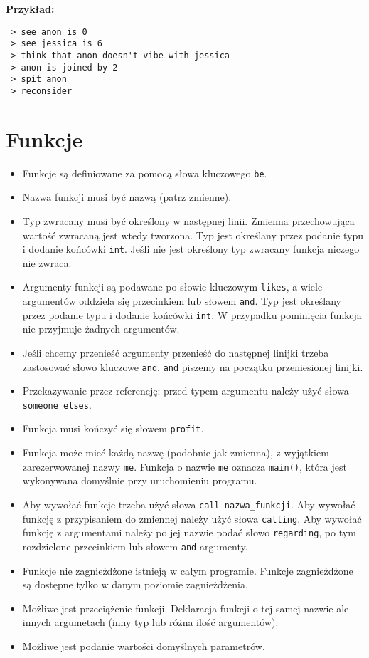 \documentclass{article}
\begin{document}
\textbf{Przykład:}
{ \color{green}
\begin{verbatim}
 > see anon is 0
 > see jessica is 6
 > think that anon doesn't vibe with jessica
 > anon is joined by 2
 > spit anon
 > reconsider
\end{verbatim}
}

\newpage

\section{Funkcje}

\begin{itemize}
    \item Funkcje są definiowane za pomocą słowa kluczowego \texttt{be}.
    \item Nazwa funkcji musi być nazwą (patrz zmienne).
    \item Typ zwracany musi być określony w następnej linii. Zmienna przechowująca wartość zwracaną jest wtedy tworzona. Typ jest określany przez podanie typu i dodanie końcówki \texttt{int}. Jeśli nie jest określony typ zwracany funkcja niczego nie zwraca.
    \item Argumenty funkcji są podawane po słowie kluczowym \texttt{likes}, a wiele argumentów oddziela się przecinkiem lub słowem \texttt{and}. Typ jest określany przez podanie typu i dodanie końcówki \texttt{int}. W przypadku pominięcia funkcja nie przyjmuje żadnych argumentów.
    \item Jeśli chcemy przenieść argumenty przenieść do następnej linijki trzeba zastosować słowo kluczowe \texttt{and}. \texttt{and} piszemy na początku przeniesionej linijki.
    \item Przekazywanie przez referencję: przed typem argumentu należy użyć słowa \texttt{someone elses}.
    \item Funkcja musi kończyć się słowem \texttt{profit}.
    \item Funkcja może mieć każdą nazwę (podobnie jak zmienna), z wyjątkiem zarezerwowanej nazwy \texttt{me}. Funkcja o nazwie \texttt{me} oznacza \texttt{main()}, która jest wykonywana domyślnie przy uruchomieniu programu.
    \item Aby wywołać funkcje trzeba użyć słowa \texttt{call nazwa\_funkcji}. Aby wywołać funkcję z przypisaniem do zmiennej należy użyć słowa \texttt{calling}. Aby wywołać funkcję z argumentami należy po jej nazwie podać słowo \texttt{regarding}, po tym rozdzielone przecinkiem lub słowem \texttt{and} argumenty.
    \item Funkcje nie zagnieżdżone istnieją w całym programie. Funkcje zagnieżdżone są dostępne tylko w danym poziomie zagnieżdżenia.
    \item Możliwe jest przeciążenie funkcji. Deklaracja funkcji o tej samej nazwie ale innych argumetach (inny typ lub różna ilość argumentów).
    \item Możliwe jest podanie wartości domyślnych parametrów.
\end{itemize}
\end{document}

